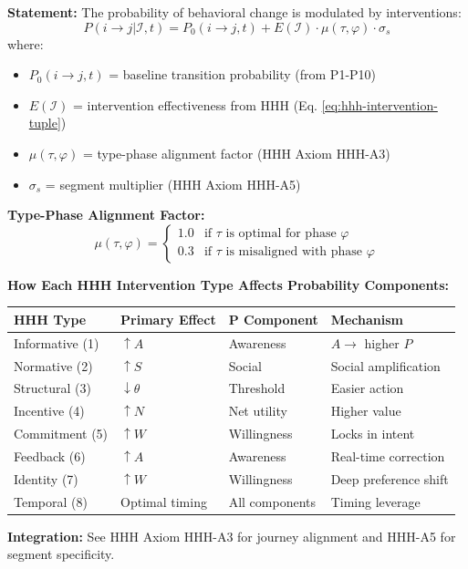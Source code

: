 \documentclass[11pt, a4paper]{article}
\begin{document}
\begin{tcolorbox}[colback=orange!5!white, colframe=orange!75!black,
    title=\textbf{Axiom P11: Intervention Modulation (NEW)}]

\textbf{Statement:} The probability of behavioral change is modulated by interventions:
\begin{equation}
P(i \to j | \mathcal{I}, t) = P_0(i \to j, t) + E(\mathcal{I}) \cdot \mu(\tau, \varphi) \cdot \sigma_s
\label{eq:bc-intervention-modulation}
\end{equation}
where:
\begin{itemize}[nosep]
\item $P_0(i \to j, t)$ = baseline transition probability (from P1-P10)
\item $E(\mathcal{I})$ = intervention effectiveness from HHH (Eq. \ref{eq:hhh-intervention-tuple})
\item $\mu(\tau, \varphi)$ = type-phase alignment factor (HHH Axiom HHH-A3)
\item $\sigma_s$ = segment multiplier (HHH Axiom HHH-A5)
\end{itemize}

\textbf{Type-Phase Alignment Factor:}
\begin{equation}
\mu(\tau, \varphi) = \begin{cases}
1.0 & \text{if } \tau \text{ is optimal for phase } \varphi \\
0.3 & \text{if } \tau \text{ is misaligned with phase } \varphi
\end{cases}
\end{equation}

\textbf{How Each HHH Intervention Type Affects Probability Components:}
\begin{center}
\renewcommand{\arraystretch}{1.2}
\begin{tabular}{@{}llll@{}}
\toprule
\textbf{HHH Type} & \textbf{Primary Effect} & \textbf{P Component} & \textbf{Mechanism} \\
\midrule
Informative (1) & $\uparrow A$ & Awareness & $A \to$ higher $P$ \\
Normative (2) & $\uparrow S$ & Social & Social amplification \\
Structural (3) & $\downarrow \theta$ & Threshold & Easier action \\
Incentive (4) & $\uparrow N$ & Net utility & Higher value \\
Commitment (5) & $\uparrow W$ & Willingness & Locks in intent \\
Feedback (6) & $\uparrow A$ & Awareness & Real-time correction \\
Identity (7) & $\uparrow W$ & Willingness & Deep preference shift \\
Temporal (8) & Optimal timing & All components & Timing leverage \\
\bottomrule
\end{tabular}
\end{center}

\textbf{Integration:} See HHH Axiom HHH-A3 for journey alignment and HHH-A5 for segment specificity.

\end{tcolorbox}
\end{document}
